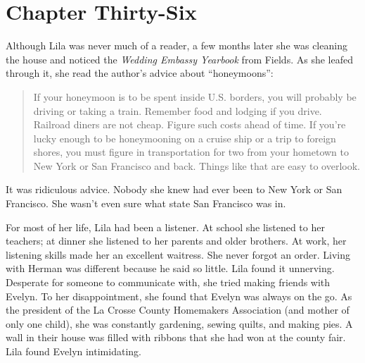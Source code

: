 \documentclass[
  letterpaper,
]{book}
\begin{document}

\chapter{Chapter Thirty-Six}\label{chapter-thirty-six}

Although Lila was never much of a reader, a few months later she was
cleaning the house and noticed the \emph{Wedding Embassy Yearbook} from
Fields. As she leafed through it, she read the author's advice about
``honeymoons'':

\begin{quote}
If your honeymoon is to be spent inside U.S. borders, you will probably
be driving or taking a train. Remember food and lodging if you drive.
Railroad diners are not cheap. Figure such costs ahead of time. If
you're lucky enough to be honeymooning on a cruise ship or a trip to
foreign shores, you must figure in transportation for two from your
hometown to New York or San Francisco and back. Things like that are
easy to overlook.
\end{quote}

It was ridiculous advice. Nobody she knew had ever been to New York or
San Francisco. She wasn't even sure what state San Francisco was in.

For most of her life, Lila had been a listener. At school she listened
to her teachers; at dinner she listened to her parents and older
brothers. At work, her listening skills made her an excellent waitress.
She never forgot an order. Living with Herman was different because he
said so little. Lila found it unnerving. Desperate for someone to
communicate with, she tried making friends with Evelyn. To her
disappointment, she found that Evelyn was always on the go. As the
president of the La Crosse County Homemakers Association (and mother of
only one child), she was constantly gardening, sewing quilts, and making
pies. A wall in their house was filled with ribbons that she had won at
the county fair. Lila found Evelyn intimidating.
\end{document}
